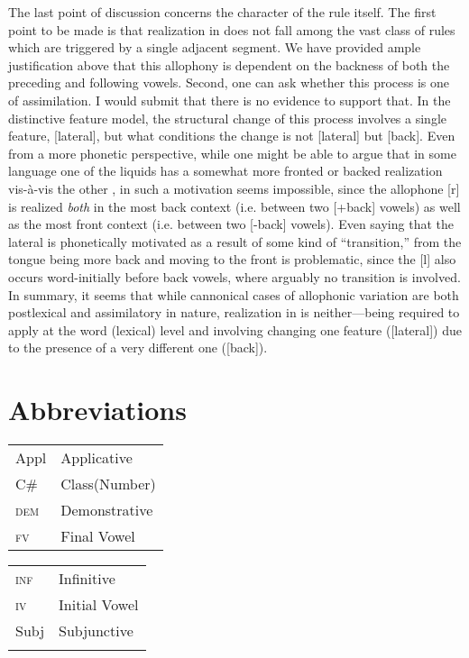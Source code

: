 \documentclass[output=paper,modfonts,nonflat,
 hidelinks
]{langsci/langscibook}
\begin{document}
The last point of discussion concerns the character of the rule itself. The first point to be made is that  realization in  does not fall among the vast class of rules which are triggered by a single adjacent segment. We have provided ample justification above that this allophony is dependent on the backness of both the preceding and following vowels. Second, one can ask whether this process is one of assimilation. I would submit that there is no evidence to support that. In the distinctive feature model, the structural change of this process involves a single feature, [lateral], but what conditions the change is not [lateral] but [back]. Even from a more phonetic perspective, while one might be able to argue that in some language one of the liquids has a somewhat more fronted or backed realization vis-à-vis the other , in  such a motivation seems impossible, since the allophone [r] is realized \textit{both} in the most back context (i.e. between two [+back] vowels) as well as the most front context (i.e. between two [-back] vowels). Even saying that the lateral is phonetically motivated as a result of some kind of “transition,” from the tongue being more back and moving to the front is problematic, since the [l] also occurs word-initially before back vowels, where arguably no transition is involved. In summary, it seems that while cannonical cases of allophonic variation are both postlexical and assimilatory in nature,  realization in  is neither—being required to apply at the word (lexical) level and involving changing one feature ([lateral]) due to the presence of a very different one ([back]).

\section*{Abbreviations}

\begin{tabularx}{.45\textwidth}{lQ}
{Appl} & {Applicative}\\
{C\#} & {Class(Number)}\\
{\textsc{dem}} & {Demonstrative}\\
{\textsc{fv}} & {Final Vowel}\\
\end{tabularx}
\begin{tabularx}{.45\textwidth}{lQ}
{\textsc{inf}} & {Infinitive}\\
\textsc{iv} & {Initial Vowel}\\
{Subj} & {Subjunctive}\\
\\
\end{tabularx}
 

\sloppy
\printbibliography[heading=subbibliography,notkeyword=this]
\end{document}
